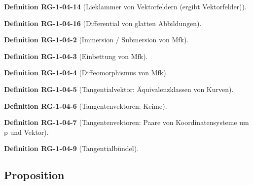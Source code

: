 \documentclass[10pt, letterpaper]{article}
\newcommand{\CustomHeading}[3]{%
  \par\medskip\noindent%
  \textbf{#1 #2} \textnormal{(#3)}.\enskip%
}
\newenvironment{DEF}[2]{\CustomHeading{Definition}{#1}{#2}}{}
\begin{document}
\begin{DEF}{RG-1-04-14}{Lieklammer von Vektorfeldern (ergibt Vektorfelder)}

\end{DEF}

\begin{DEF}{RG-1-04-16}{Differential von glatten Abbildungen}

\end{DEF}

\begin{DEF}{RG-1-04-2}{Immersion / Submersion von Mfk}

\end{DEF}

\begin{DEF}{RG-1-04-3}{Einbettung von Mfk}

\end{DEF}

\begin{DEF}{RG-1-04-4}{Diffeomorphismus von Mfk}

\end{DEF}

\begin{DEF}{RG-1-04-5}{Tangentialvektor: Äquivalenzklassen von Kurven}

\end{DEF}

\begin{DEF}{RG-1-04-6}{Tangentenvektoren: Keime}

\end{DEF}

\begin{DEF}{RG-1-04-7}{Tangentenvektoren: Paare von Koordinatensysteme um p und Vektor}

\end{DEF}

\begin{DEF}{RG-1-04-9}{Tangentialbündel}

\end{DEF}























\subsection{Proposition}
\end{document}
